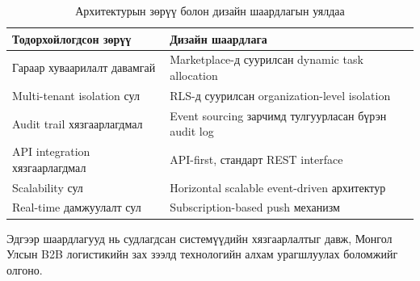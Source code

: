 \begin{table}[h!]
\centering
\renewcommand{\arraystretch}{1.3}
\caption{Архитектурын зөрүү болон дизайн шаардлагын уялдаа}
\label{tab:gap_design_mapping}
\begin{tabular}{|p{5.5cm}|p{7cm}|}
\hline
\textbf{Тодорхойлогдсон зөрүү} & \textbf{Дизайн шаардлага} \\
\hline
Гараар хуваарилалт давамгай & Marketplace-д суурилсан dynamic task allocation \\
\hline
Multi-tenant isolation сул & RLS-д суурилсан organization-level isolation \\
\hline
Audit trail хязгаарлагдмал & Event sourcing зарчимд тулгуурласан бүрэн audit log \\
\hline
API integration хязгаарлагдмал & API-first, стандарт REST interface \\
\hline
Scalability сул & Horizontal scalable event-driven архитектур \\
\hline
Real-time дамжуулалт сул & Subscription-based push механизм \\
\hline
\end{tabular}
\end{table}

Эдгээр шаардлагууд нь судлагдсан системүүдийн хязгаарлалтыг давж, Монгол Улсын B2B логистикийн зах зээлд технологийн алхам урагшлуулах боломжийг олгоно.